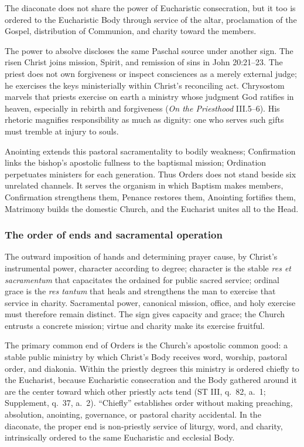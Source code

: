 The diaconate does not share the power of Eucharistic consecration, but it too is ordered to the Eucharistic Body through service of the altar, proclamation of the Gospel, distribution of Communion, and charity toward the members.

The power to absolve discloses the same Paschal source under another sign. The risen Christ joins mission, Spirit, and remission of sins in John 20:21--23. The priest does not own forgiveness or inspect consciences as a merely external judge; he exercises the keys ministerially within Christ's reconciling act. Chrysostom marvels that priests exercise on earth a ministry whose judgment God ratifies in heaven, especially in rebirth and forgiveness (\emph{On the Priesthood} III.5--6). His rhetoric magnifies responsibility as much as dignity: one who serves such gifts must tremble at injury to souls.

Anointing extends this pastoral sacramentality to bodily weakness; Confirmation links the bishop's apostolic fullness to the baptismal mission; Ordination perpetuates ministers for each generation. Thus Orders does not stand beside six unrelated channels. It serves the organism in which Baptism makes members, Confirmation strengthens them, Penance restores them, Anointing fortifies them, Matrimony builds the domestic Church, and the Eucharist unites all to the Head.

\subsubsection{The order of ends and sacramental operation}

The outward imposition of hands and determining prayer cause, by Christ's instrumental power, character according to degree; character is the stable \emph{res et sacramentum} that capacitates the ordained for public sacred service; ordinal grace is the \emph{res tantum} that heals and strengthens the man to exercise that service in charity. Sacramental power, canonical mission, office, and holy exercise must therefore remain distinct. The sign gives capacity and grace; the Church entrusts a concrete mission; virtue and charity make its exercise fruitful.

The primary common end of Orders is the Church's apostolic common good: a stable public ministry by which Christ's Body receives word, worship, pastoral order, and diakonia. Within the priestly degrees this ministry is ordered chiefly to the Eucharist, because Eucharistic consecration and the Body gathered around it are the center toward which other priestly acts tend (ST III, q.~82, a.~1; Supplement, q.~37, a.~2). ``Chiefly'' establishes order without making preaching, absolution, anointing, governance, or pastoral charity accidental. In the diaconate, the proper end is non-priestly service of liturgy, word, and charity, intrinsically ordered to the same Eucharistic and ecclesial Body.

